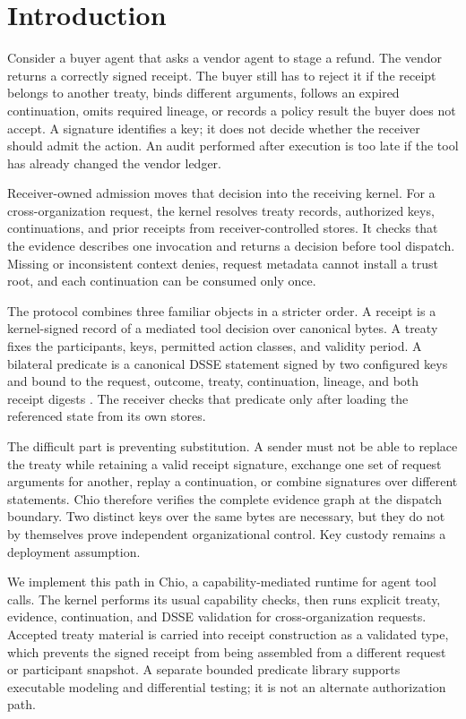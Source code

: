 \section{Introduction}

Consider a buyer agent that asks a vendor agent to stage a refund. The vendor
returns a correctly signed receipt. The buyer still has to reject it if the
receipt belongs to another treaty, binds different arguments, follows an
expired continuation, omits required lineage, or records a policy result the
buyer does not accept. A signature identifies a key; it does not decide whether
the receiver should admit the action. An audit performed after execution is too
late if the tool has already changed the vendor ledger.

Receiver-owned admission moves that decision into the receiving kernel. For a
cross-organization request, the kernel resolves treaty records, authorized
keys, continuations, and prior receipts from receiver-controlled stores. It
checks that the evidence describes one invocation and returns a decision before
tool dispatch. Missing or inconsistent context denies, request metadata cannot
install a trust root, and each continuation can be consumed only once.

The protocol combines three familiar objects in a stricter order. A receipt is
a kernel-signed record of a mediated tool decision over canonical bytes. A
treaty fixes the participants, keys, permitted action classes, and validity
period. A bilateral predicate is a canonical DSSE statement signed by two
configured keys and bound to the request, outcome, treaty, continuation,
lineage, and both receipt digests \cite{dsse,rfc8785}. The receiver checks that
predicate only after loading the referenced state from its own stores.

The difficult part is preventing substitution. A sender must not be able to
replace the treaty while retaining a valid receipt signature, exchange one set
of request arguments for another, replay a continuation, or combine signatures
over different statements. Chio therefore verifies the complete evidence graph
at the dispatch boundary. Two distinct keys over the same bytes are necessary,
but they do not by themselves prove independent organizational control. Key
custody remains a deployment assumption.

We implement this path in Chio, a capability-mediated runtime for agent tool
calls. The kernel performs its usual capability checks, then runs explicit
treaty, evidence, continuation, and DSSE validation for cross-organization
requests. Accepted treaty material is carried into receipt
construction as a validated type, which prevents the signed receipt
from being assembled from a different request or participant snapshot. A
separate bounded predicate library supports executable modeling and
differential testing; it is not an alternate authorization path.

